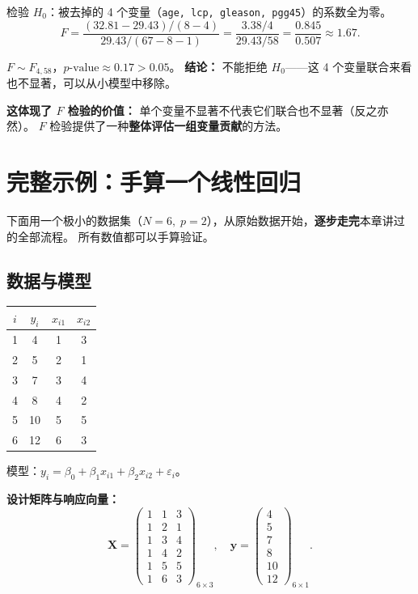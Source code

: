 检验 $H_0$：被去掉的 4 个变量（\texttt{age, lcp, gleason, pgg45}）的系数全为零。
\[
    F = \frac{(32.81 - 29.43) / (8 - 4)}{29.43 / (67 - 8 - 1)}
    = \frac{3.38 / 4}{29.43 / 58}
    = \frac{0.845}{0.507}
    \approx 1.67.
\]

$F \sim F_{4, 58}$，$p \text{-value} \approx 0.17 > 0.05$。
\textbf{结论：} 不能拒绝 $H_0$——这 4 个变量联合来看也不显著，可以从小模型中移除。

\textbf{这体现了 $F$ 检验的价值：} 单个变量不显著不代表它们联合也不显著（反之亦然）。
$F$ 检验提供了一种\textbf{整体评估一组变量贡献}的方法。

\section{完整示例：手算一个线性回归}

下面用一个极小的数据集（$N=6,\; p=2$），从原始数据开始，\textbf{逐步走完}本章讲过的全部流程。
所有数值都可以手算验证。

\subsection{数据与模型}

\begin{center}
\renewcommand{\arraystretch}{1.2}
\begin{tabular}{c|ccc}
\toprule
$i$ & $y_i$ & $x_{i1}$ & $x_{i2}$ \\
\midrule
1 & 4  & 1 & 3 \\
2 & 5  & 2 & 1 \\
3 & 7  & 3 & 4 \\
4 & 8  & 4 & 2 \\
5 & 10 & 5 & 5 \\
6 & 12 & 6 & 3 \\
\bottomrule
\end{tabular}
\end{center}

模型：$y_i = \beta_0 + \beta_1 x_{i1} + \beta_2 x_{i2} + \varepsilon_i$。

\textbf{设计矩阵与响应向量：}
\[
    \mathbf{X} = \begin{pmatrix}
        1 & 1 & 3 \\
        1 & 2 & 1 \\
        1 & 3 & 4 \\
        1 & 4 & 2 \\
        1 & 5 & 5 \\
        1 & 6 & 3
    \end{pmatrix}_{6 \times 3},
    \quad
    \mathbf{y} = \begin{pmatrix} 4 \\ 5 \\ 7 \\ 8 \\ 10 \\ 12 \end{pmatrix}_{6 \times 1}.
\]

